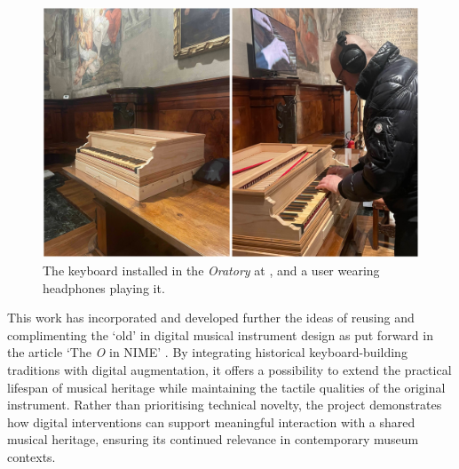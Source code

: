 \begin{figure}
\centering
\includegraphics[width = \linewidth]{src/images/keyboardMuseum.JPEG}
\caption{The keyboard installed in the \emph{Oratory} at , and a user wearing headphones playing it.}
\label{fig:oratory}
\end{figure}

This work has incorporated and developed further the ideas of reusing and complimenting the `old' in digital musical instrument design as put forward in the article `The \emph{O} in NIME' \cite{Masu_NIME_2023}. By integrating historical keyboard-building traditions with digital augmentation, it offers a possibility to extend the practical lifespan of musical heritage while maintaining the tactile qualities of the original instrument. Rather than prioritising technical novelty, the project demonstrates how digital interventions can support meaningful interaction with a shared musical heritage, ensuring its continued relevance in contemporary museum contexts.

